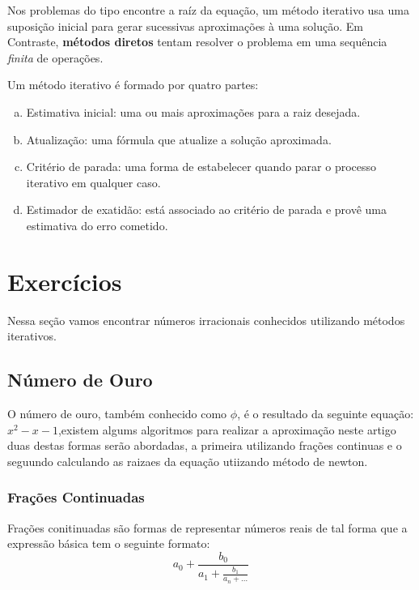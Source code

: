 \documentclass[a4paper]{article}
\begin{document}
Nos problemas do tipo encontre a raíz da equação, um método iterativo usa
uma suposição inicial para gerar sucessivas aproximações à uma solução. Em
Contraste, \textbf{métodos diretos} tentam resolver o problema em uma sequência
\emph{finita} de operações.

Um método iterativo é formado por quatro partes:~\cite{claudio2000calculo}
\begin{enumerate}[a)]
	\item Estimativa inicial: uma ou mais aproximações para a raiz desejada.
    \item Atualização: uma fórmula que atualize a solução aproximada.
    \item Critério de parada: uma forma de estabelecer quando parar o processo iterativo em qualquer caso.
    \item Estimador de exatidão: está associado ao critério de parada e provê uma estimativa do erro cometido.
\end{enumerate}

\newpage

\section{Exercícios}
Nessa seção vamos encontrar números irracionais conhecidos utilizando métodos iterativos.

\subsection{Número de Ouro}

	O número de ouro, também conhecido como $\phi$, é o resultado da seguinte
	equação: $x^2-x-1$,existem algums algoritmos para realizar a aproximação
	neste artigo duas destas formas serão abordadas, a primeira utilizando
	frações continuas e o seguundo calculando as raizaes da equação utiizando
	método de newton.

\subsubsection{Frações Continuadas}

	Frações conitinuadas são formas de representar números reais de tal forma
	que a expressão básica tem o seguinte formato:
	\begin{equation}\label{eq:phi}
		a_0 + \frac{b_0}{a_1 + \frac{b_1}{a_n + \dots}}
	\end{equation}
\end{document}
